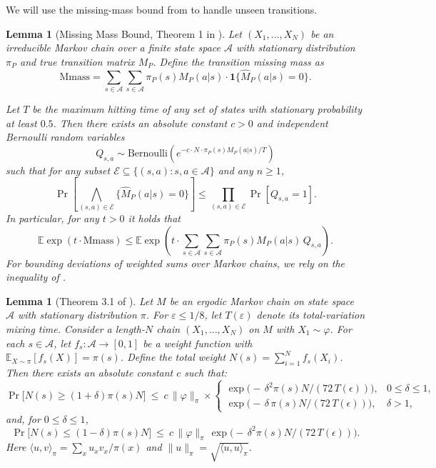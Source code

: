 \documentclass{article}
\theoremstyle{plain}
\newtheorem{lemma}[theorem]{Lemma}
\theoremstyle{definition}
\theoremstyle{remark}
\begin{document}
We will use the missing-mass bound from \cite{skorski2020missingmassconcentrationmarkov} to handle unseen transitions.
\begin{lemma}[Missing Mass Bound, Theorem 1 in \cite{skorski2020missingmassconcentrationmarkov}] \label{thm:missing-mass}
Let $(X_1, \dots, X_N)$ be an irreducible Markov chain over a finite state space $\mathcal{A}$ with stationary distribution $\pi_P$ and true transition matrix $M_P$. Define the \emph{transition missing mass} as
\[
\mathrm{Mmass }=\sum_{s \in \mathcal{A}} \sum_{s \in \mathcal{A}} \pi_P(s) M_P(a|s) \cdot \mathbf{1}\{\hat{M}_P(a|s) = 0\}.
\]

Let $T$ be the maximum hitting time of any set of states with stationary probability at least $0.5$. Then there exists an absolute constant $c > 0$ and independent Bernoulli random variables
\[
Q_{s,a} \sim \mathrm{Bernoulli}\left(e^{-c \cdot N \cdot \pi_P(s)M_P(a|s) / T}\right)
\]
such that for any subset $\mathcal{E} \subseteq \{(s,a) :s, a \in \mathcal{A}\}$ and any $n \ge 1$,
\[
\Pr\left[ \bigwedge_{(s,a) \in \mathcal{E}} \{\hat{M}_P(a|s) = 0\} \right]
\le \prod_{(s,a) \in \mathcal{E}} \Pr[ Q_{s,a} = 1 ].
\]
In particular, for any $t > 0$ it holds that
\[
\mathbb{E} \exp\left( t \cdot \mathrm{Mmass}\right)
\le
\mathbb{E} \exp\left( t \cdot \sum_{s \in \mathcal{A}} \sum_{s \in \mathcal{A}}  \pi_P(s)M_P(a|s) \, Q_{s,a} \right).
\]
For bounding deviations of weighted sums over Markov chains, we rely on the inequality of \cite{chung2012chernoffhoeffdingboundsmarkovchains}.
\end{lemma}
\begin{lemma}[Theorem 3.1 of \cite{chung2012chernoffhoeffdingboundsmarkovchains}] \label{thm:estimation-state}
Let \(M\) be an ergodic Markov chain on state space $\mathcal{A}$ with stationary distribution \(\pi\).
For \(\varepsilon \le 1/8\), let \(T(\varepsilon)\) denote its total-variation mixing time.
Consider a length-\(N\) chain $(X_1, \dots, X_N)$ on \(M\) with $X_1 \sim \varphi$.
For each \(s\in \mathcal{A}\), let \(f_s:\mathcal{A}\to[0,1]\) be a weight function with
\(\mathbb{E}_{X\sim\pi}[f_s(X)] = \pi(s)\).
Define the total weight \(N(s)=\sum_{i=1}^N f_s(X_i)\).
Then there exists an absolute constant \(c\) such that:
\[
\Pr\!\big[N(s) \ge (1+\delta)\pi(s) N\big]
\ \le\
c\,\|\varphi\|_{\pi}\times
\begin{cases}
\exp\!\big(-\,\delta^{2}\pi(s) N/(72\,T(\epsilon))\big), & 0\le \delta \le 1,\\[4pt]
\exp\!\big(-\,\delta\,\pi(s)N/(72\,T(\epsilon))\big), & \delta>1,
\end{cases}
\]
and, for \(0\le \delta\le 1\),
\[
\Pr\!\big[N(s) \le (1-\delta)\pi(s) N\big]
\ \le\
c\,\|\varphi\|_{\pi}\,\exp\!\big(-\,\delta^{2}\pi(s) N/(72\,T(\epsilon))\big).
\]
Here \(\langle u,v\rangle_{\pi}=\sum_{x}u_x v_x/\pi(x)\) and
\(\|u\|_{\pi}=\sqrt{\langle u,u\rangle_{\pi}}\).
\end{lemma}
\end{document}
